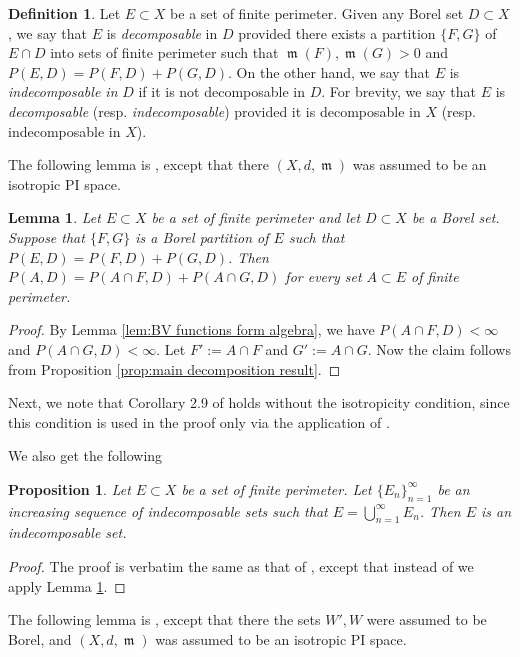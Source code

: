 \documentclass[11pt]{article}
\numberwithin{equation}{section}
\theoremstyle{plain}
\newtheorem{lemma}[equation]{Lemma}
\newtheorem{proposition}[equation]{Proposition}
\theoremstyle{definition}
\newtheorem{definition}[equation]{Definition}
\numberwithin{equation}{section}
\DeclareMathOperator{\frm}{\mathfrak{m}}
\begin{document}
\begin{definition}
Let $E\subset X$ be a set of finite perimeter. Given any Borel set $D\subset X$, we say that
$E$ is \emph{decomposable} in $D$ provided there exists a partition $\{F,G\}$ of $E\cap D$
into sets of finite perimeter such that $\frm(F),\frm(G)>0$ and $P(E,D)=P(F,D)+P(G,D)$.
On the other hand, we say that $E$ is \emph{indecomposable in} $D$ if it is not
decomposable in $D$. For brevity, we say that $E$ is \emph{decomposable}
(resp. \emph{indecomposable}) provided it is decomposable in $X$ (resp. indecomposable in $X$).
\end{definition}

The following lemma is \cite[Lemma 2.8]{BPR},
except that there $(X,d,\frm)$ was assumed to be an isotropic PI space.

\begin{lemma}\label{lem:Lemma 2.8}
Let $E\subset X$ be a set
of finite perimeter and let $D\subset X$ be a Borel set. Suppose that $\{F,G\}$ is a Borel partition
of $E$ such that $P(E,D)=P(F,D)+P(G,D)$. Then $P(A,D)=P(A\cap F,D)+P(A\cap G,D)$
for every set $A\subset E$ of finite perimeter.
\end{lemma}
\begin{proof}
By Lemma \ref{lem:BV functions form algebra}, we have
$P(A\cap F,D)<\infty$ and $P(A\cap G,D)<\infty$.
Let $F':=A\cap F$ and $G':=A\cap G$.
Now the claim follows from Proposition \ref{prop:main decomposition result}.
\end{proof}

Next, we note that Corollary 2.9 of \cite{BPR} holds without the isotropicity
condition, since this condition is used in the proof only via the application of \cite[Lemma 2.8]{BPR}.

We also get the following

\begin{proposition}\label{prop:stability}
Let $E\subset X$ be a set of finite perimeter.
Let $\{E_n\}_{n=1}^{\infty}$ be an increasing sequence of indecomposable sets
such that $E=\bigcup_{n=1}^{\infty}E_n$. Then $E$ is an indecomposable set.
\end{proposition}
\begin{proof}
The proof is verbatim the same as that of \cite[Proposition 2.10]{BPR}, except that
instead of \cite[Lemma 2.8]{BPR} we apply Lemma \ref{lem:Lemma 2.8}.
\end{proof}

The following lemma is \cite[Lemma 2.11]{BPR}, except that there the sets $W',W$
were assumed to be Borel, and $(X,d,\frm)$ was assumed to be an isotropic PI space.
\end{document}
